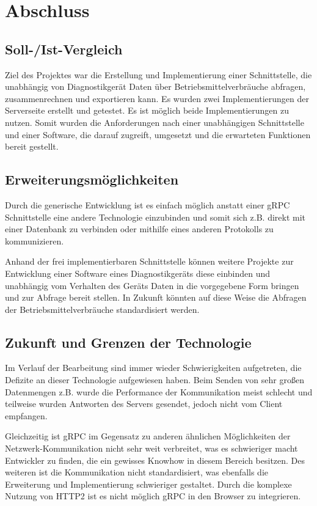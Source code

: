 \section{Abschluss}
\label{sec:Abschluss}

\subsection{Soll-/Ist-Vergleich}
\label{sec:SollIstVergleich}
Ziel des Projektes war die Erstellung und Implementierung einer Schnittstelle, die unabhängig von Diagnostikgerät Daten über Betriebsmittelverbräuche abfragen, zusammenrechnen und exportieren kann. Es wurden zwei Implementierungen der Serverseite erstellt und getestet. Es ist möglich beide Implementierungen zu nutzen. Somit wurden die Anforderungen nach einer unabhängigen Schnittstelle und einer Software, die darauf zugreift, umgesetzt und die erwarteten Funktionen bereit gestellt.

\subsection{Erweiterungsmöglichkeiten}
\label{sec:Erweiterungsmoeglichkeiten}
Durch die generische Entwicklung ist es einfach möglich anstatt einer {\acs{gRPC}} Schnittstelle eine andere Technologie einzubinden und somit sich z.B. direkt mit einer Datenbank zu verbinden oder mithilfe eines anderen Protokolls zu kommunizieren.

Anhand der frei implementierbaren Schnittstelle können weitere Projekte zur Entwicklung einer Software eines Diagnostikgeräts diese einbinden und unabhängig vom Verhalten des Geräts Daten in die vorgegebene Form bringen und zur Abfrage bereit stellen. In Zukunft könnten auf diese Weise die Abfragen der Betriebsmittelverbräuche standardisiert werden.

\subsection{Zukunft und Grenzen der Technologie}
\label{sec:ZukunftUndGrenzen}
Im Verlauf der Bearbeitung sind immer wieder Schwierigkeiten aufgetreten, die Defizite an dieser Technologie aufgewiesen haben. Beim Senden von sehr großen Datenmengen z.B. wurde die Performance der Kommunikation meist schlecht und teilweise wurden Antworten des Servers gesendet, jedoch nicht vom Client empfangen.

Gleichzeitig ist {\acs{gRPC}} im Gegensatz zu anderen ähnlichen Möglichkeiten der Netzwerk-Kommunikation nicht sehr weit verbreitet, was es schwieriger macht Entwickler zu finden, die ein gewisses Knowhow in diesem Bereich besitzen. Des weiteren ist die Kommunikation nicht standardisiert, was ebenfalls die Erweiterung und Implementierung schwieriger gestaltet. Durch die komplexe Nutzung von {\acs{HTTP2}} ist es nicht möglich {\acs{gRPC}} in den Browser zu integrieren.

